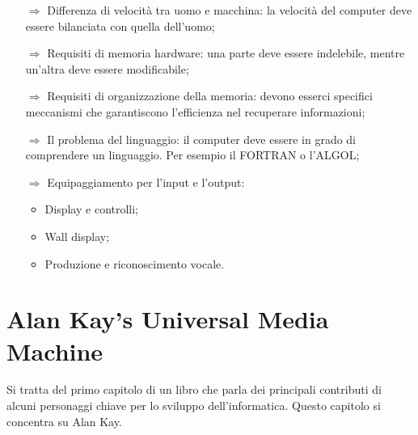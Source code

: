 \begin{itemize}
    \item [$\Rightarrow$] Differenza di velocità tra uomo e macchina: la velocità del computer 
    deve essere bilanciata con quella dell'uomo;
    \item [$\Rightarrow$] Requisiti di memoria hardware: una parte deve essere indelebile, mentre
    un'altra deve essere modificabile;
    \item [$\Rightarrow$] Requisiti di organizzazione della memoria: devono esserci specifici meccanismi
    che garantiscono l'efficienza nel recuperare informazioni;
    \item [$\Rightarrow$] Il problema del linguaggio: il computer deve essere in grado di comprendere
    un linguaggio. Per esempio il FORTRAN o l'ALGOL;
    \item [$\Rightarrow$] Equipaggiamento per l'input e l'output:
    \begin{itemize}
        \item Display e controlli;
        \item Wall display;
        \item Produzione e riconoscimento vocale.
    \end{itemize}
\end{itemize}

\section{Alan Kay's Universal Media Machine}

Si tratta del primo capitolo di un libro che parla dei principali
contributi di alcuni personaggi chiave per lo sviluppo dell'informatica.
Questo capitolo si concentra su Alan Kay.

